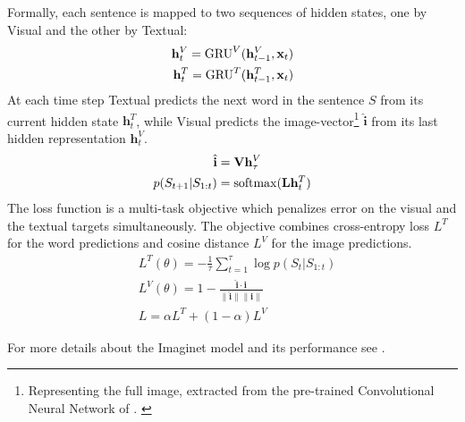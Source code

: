 Formally, each sentence is mapped to two sequences of hidden states, 
one by {\sc Visual} and the other by {\sc Textual}:
\vspace{-.2cm}
\begin{align}
  \mathbf{h}^{V}_t = \mathrm{GRU}^V(\mathbf{h}^{V}_{t-1},\mathbf{x}_t)\\
  \mathbf{h}^{T}_t = \mathrm{GRU}^T(\mathbf{h}^{T}_{t-1},\mathbf{x}_t)
\vspace{-.1cm}
\end{align}
%
At each time step {\sc Textual} predicts the next word in the sentence
$S$ from its current hidden state $\mathbf{h}^{T}_t$, while {\sc
  Visual} predicts the image-vector\footnote{Representing the full image, 
  extracted from the pre-trained Convolutional Neural Network of 
  . \label{edit:dumdumeddy}}
$\hat{\mathbf{i}}$ from its last
hidden representation $\mathbf{h}^{V}_t$.
%
\vspace{-.2cm}
\begin{align}
   \hat{\mathbf{i}} &= \mathbf{V} \mathbf{h}^{V}_\tau \\
    p(S_{t+1}|S_{1:t}) &= \mathrm{softmax}(\mathbf{L}\mathbf{h}^T_t)
\vspace{-.1cm}
\end{align}
%
The loss function is a multi-task objective which penalizes error on
the visual and the textual targets simultaneously. The objective
combines cross-entropy loss $L^{T}$ for the word predictions
and cosine distance $L^V$ for the image
predictions.
%
\begin{align}
&L^{T}(\theta) = {-} \frac{1}{\tau}\sum_{t=1}^\tau \log p(S_t|S_{1:t}) \\
%
&L^V(\theta) =  1 - \frac{\hat{\mathbf{i}} \cdot \mathbf{i}}{\| \hat{\mathbf{i}} \| \| \mathbf{i} \|} \\
%
&L = \alpha L^T + (1-\alpha)L^{V}
\end{align}
%

\noindent
For more details about the {\sc Imaginet} model and 
its performance see .

